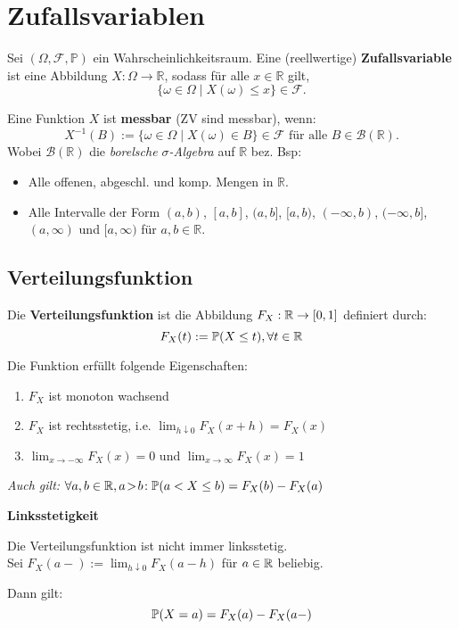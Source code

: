 \section{Zufallsvariablen}
Sei $(\Omega, \mathcal{F}, \mathbb{P})$ ein  
Wahrscheinlichkeitsraum. Eine (reellwertige) \textbf{Zufallsvariable} ist eine Abbildung $X: \Omega \rightarrow \mathbb{R}$, sodass für alle $x \in \mathbb{R}$ gilt,
$$
\{\omega \in \Omega \mid X(\omega) \leq x\} \in \mathcal{F} .
$$

Eine Funktion $X$ ist \textbf{messbar} (ZV sind messbar), wenn:
$$
X^{-1}(B):=\{\omega \in \Omega \mid X(\omega) \in B\} \in \mathcal{F} \text{ für alle } B \in \mathcal{B}(\mathbb{R}).
$$
Wobei $\mathcal{B}(\mathbb{R})$ die \textit{borelsche $\sigma$-Algebra} auf $\mathbb{R}$ bez. Bsp:

\begin{itemize}
    \item Alle offenen, abgeschl. und komp. Mengen in $\mathbb{R}$.
    \item Alle Intervalle der Form $(a, b)$, $[a, b]$, $(a, b]$, $[a, b)$, $(-\infty, b)$, $(-\infty, b]$, $(a, \infty)$ und $[a, \infty)$ für $a, b \in \mathbb{R}$.
\end{itemize}
\subsection{Verteilungsfunktion}
Die \textbf{Verteilungsfunktion} ist die Abbildung $F_X : \R \to [0,1]$ definiert durch:
$$F_X(t) := \P(X \leq t), \forall t \in \R$$

Die Funktion erfüllt folgende Eigenschaften:
\begin{enumerate}[label=\roman*)]
    \item $F_X$ ist monoton wachsend 
    \item $F_X$ ist rechtsstetig, i.e. $\lim_{h \downarrow 0}F_X(x+h) = F_X(x)$
    \item $\lim_{x \to -\infty}F_X(x) = 0$ und $\lim_{x \to \infty}F_X(x) = 1$
\end{enumerate}
\textit{Auch gilt:} $\forall a,b \in \R, a\!>\!b\!: \P(a < X \leq b) = F_X(b) -F_X(a)$
\vspace{-0.6\baselineskip}


\textbf{Linksstetigkeit}

Die Verteilungsfunktion ist nicht immer linksstetig.
\\Sei $F_X(a-) := \lim_{h \downarrow 0}F_X(a-h)$ für $a \in \R$ beliebig.

Dann gilt:
$$\P(X = a) = F_X(a) - F_X(a-)$$

